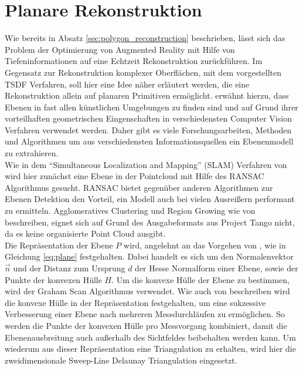 \section{Planare Rekonstruktion}

Wie bereits in Absatz \ref{sec:polygon_reconstruction} beschrieben, lässt sich das Problem der Optimierung von Augmented Reality mit Hilfe von Tiefeninformationen auf eine Echtzeit Rekonstruktion zurückführen. Im Gegensatz zur Rekonstruktion komplexer Oberflächen, mit dem vorgestellten TSDF Verfahren, soll hier eine Idee näher erläutert werden, die eine Rekonstruktion allein auf planaren Primitiven ermöglicht. \citet{yang2010plane} erwähnt hierzu, dass Ebenen in fast allen künstlichen Umgebungen zu finden sind und auf Grund ihrer vorteilhaften geometrischen Eingenschaften in verschiedensten Computer Vision Verfahren verwendet werden. Daher gibt es viele Forschungsarbeiten, Methoden und Algorithmen um aus verschiedensten Informationsquellen ein Ebenenmodell zu extrahieren.\\

Wie in dem \enquote{Simultaneous Localization and Mapping} (SLAM) Verfahren von \citet{trevor2012planar} wird hier zunächst eine Ebene in der Pointcloud mit Hilfe des RANSAC Algorithmus gesucht. RANSAC bietet gegenüber anderen Algorithmen zur Ebenen Detektion den Vorteil, ein Modell auch bei vielen Ausreißern performant zu ermitteln. Agglomeratives Clustering und Region Growing wie von \citet{feng2014fast} beschreiben, eignet sich auf Grund des Ausgabeformats aus Project Tango nicht, da es keine organisierte Point Cloud ausgibt. \\

Die Repräsentation der Ebene \(P\) wird, angelehnt an das Vorgehen von \citet{trevor2012planar}, wie in Gleichung \ref{eq:plane} festgehalten. Dabei handelt es sich um den Normalenvektor \(\vec{n}\) und der Distanz zum Ursprung \(d\) der Hesse Normalform einer Ebene, sowie der Punkte der konvexen Hülle \(H\). Um die konvexe Hülle der Ebene zu bestimmen, wird der Graham Scan Algorithmus verwendet. Wie auch von \citet{trevor2012planar} beschreiben wird die konvexe Hülle in der Repräsentation festgehalten, um eine sukzessive Verbesserung einer Ebene nach mehreren Messdurchläufen zu ermöglichen. So werden die Punkte der konvexen Hülle pro Messvorgang kombiniert, damit die Ebenenausbreitung auch außerhalb des Sichtfeldes beibehalten werden kann. Um wiederum aus dieser Repräsentation eine Triangulation zu erhalten, wird hier die zweidimensionale Sweep-Line Delaunay Triangulation eingesetzt. 


